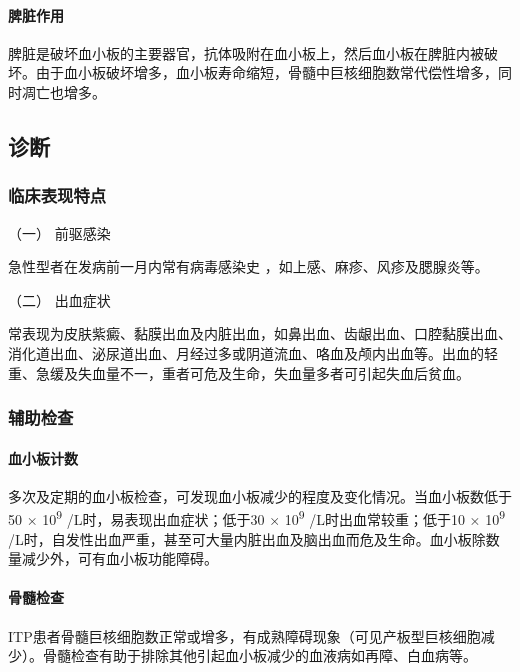 \paragraph{脾脏作用}

脾脏是破坏血小板的主要器官，抗体吸附在血小板上，然后血小板在脾脏内被破坏。由于血小板破坏增多，血小板寿命缩短，骨髓中巨核细胞数常代偿性增多，同时凋亡也增多。

\subsection{诊断}

\subsubsection{临床表现特点}

\hypertarget{text00331.htmlux5cux23CHP12-1-1-2-1-1}{}
（一） 前驱感染

急性型者在发病前一月内常有病毒感染史 ，如上感、麻疹、风疹及腮腺炎等。

\hypertarget{text00331.htmlux5cux23CHP12-1-1-2-1-2}{}
（二） 出血症状

常表现为皮肤紫癜、黏膜出血及内脏出血，如鼻出血、齿龈出血、口腔黏膜出血、消化道出血、泌尿道出血、月经过多或阴道流血、咯血及颅内出血等。出血的轻重、急缓及失血量不一，重者可危及生命，失血量多者可引起失血后贫血。

\subsubsection{辅助检查}

\paragraph{血小板计数}

多次及定期的血小板检查，可发现血小板减少的程度及变化情况。当血小板数低于50
× 10\textsuperscript{9} /L时，易表现出血症状；低于30 ×
10\textsuperscript{9} /L时出血常较重；低于10 × 10\textsuperscript{9}
/L时，自发性出血严重，甚至可大量内脏出血及脑出血而危及生命。血小板除数量减少外，可有血小板功能障碍。

\paragraph{骨髓检查}

ITP患者骨髓巨核细胞数正常或增多，有成熟障碍现象（可见产板型巨核细胞减少）。骨髓检查有助于排除其他引起血小板减少的血液病如再障、白血病等。


